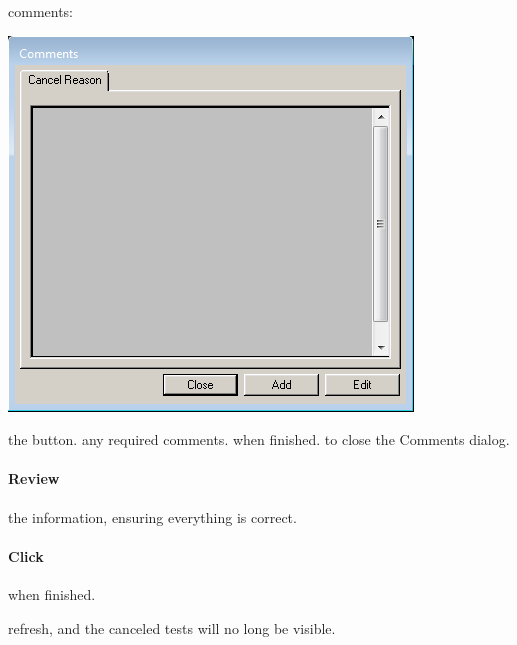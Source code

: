  comments:\begin{marginfigure}
          \includegraphics[width=0.8\linewidth]{graphics/cancel_comment_dialog.png}
\end{marginfigure}

\begin{description}
       the  button.
       any required comments.
         when finished.
        to close the Comments dialog.
\end{description}

\paragraph{Review} the information, ensuring everything is correct.\\


\paragraph{Click}   when finished.

 refresh, and the canceled tests will no long be visible.
